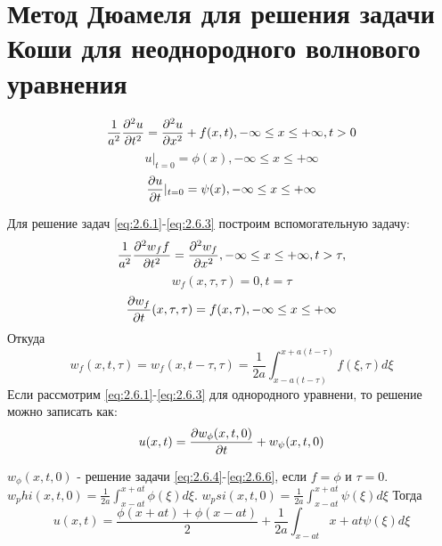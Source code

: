 \documentclass[../main.tex]{subfiles}
\begin{document}
\section{Метод Дюамеля для решения задачи Коши для неоднородного волнового уравнения}

\begin{equation}
	\label{eq:2.6.1}
	\frac{1}{a^2}\frac{\partial ^2u}{\partial t^2} = \frac{\partial ^2u}{\partial x^2} + f(x, t), -\infty \leq x \leq +\infty, t > 0
\end{equation}
\begin{equation}
	\label{eq:2.6.2}
	u|_{t=0} = \phi(x), -\infty \leq x \leq +\infty
\end{equation}
\begin{equation}
	\label{eq:2.6.3}
	\frac{\partial u}{\partial t}|_{t=0}=\psi(x), -\infty \leq x \leq +\infty
\end{equation}

Для решение задач \eqref{eq:2.6.1}-\eqref{eq:2.6.3} построим вспомогательную задачу:
\begin{equation}
	\label{eq:2.6.4}
	\frac{1}{a^2}\frac{\partial ^2w_ff}{\partial t^2}=\frac{\partial ^2w_f}{\partial x^2}, -\infty \leq x \leq +\infty, t > \tau,
\end{equation}
\begin{equation}
	\label{eq:2.6.5}
	w_f(x, \tau, \tau) = 0, t = \tau
\end{equation}
\begin{equation}
	\label{eq:2.6.6}
	\frac{\partial w_f}{\partial t}(x, \tau, \tau) = f(x, \tau), -\infty \leq x \leq +\infty
\end{equation}
Откуда
$$
	w_f(x, t, \tau)=w_f(x, t-\tau,\tau) = \frac{1}{2a}\int_{x-a(t-\tau)}^{x+a(t-\tau)}f(\xi, \tau)d\xi
$$
Если рассмотрим \eqref{eq:2.6.1}-\eqref{eq:2.6.3} для однородного уравнени, то решение можно записать как:
\begin{equation}
	u(x, t)=\frac{\partial w_\phi(x, t, 0)}{\partial t} + w_\psi(x, t, 0)
\end{equation}

$w_\phi(x, t, 0)$ - решение задачи \eqref{eq:2.6.4}-\eqref{eq:2.6.6},
если $f = \phi$ и $\tau = 0$.
$w_phi(x, t, 0) = \frac{1}{2a}\int_{x-at}^{x+at}\phi(\xi)d\xi$.
$w_psi(x, t, 0) = \frac{1}{2a}\int_{x-at}^{x+at}\psi(\xi)d\xi$
Тогда
\begin{equation}
	u(x, t) = \frac{\phi(x+at) + \phi(x - at)}{2} + \frac{1}{2a}\int_{x - at}{x+at}\psi(\xi)d\xi
\end{equation}
\end{document}
